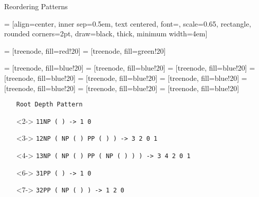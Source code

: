 \documentclass[18pt]{beamer}
\newcommand{\ul}[1]{{\color{red}{#1}}}
\begin{document}
\begin{frame}{Reordering Patterns}

 = [align=center, inner sep=0.5em, text centered, font=\sffamily, scale=0.65, rectangle, rounded corners=2pt, draw=black, thick, minimum width=4em]

 = [treenode, fill=red!20]
 = [treenode, fill=green!20]

 = [treenode, fill=blue!20]
 = [treenode, fill=blue!20]
 = [treenode, fill=blue!20]
 = [treenode, fill=blue!20]
 = [treenode, fill=blue!20]
 = [treenode, fill=blue!20]
 = [treenode, fill=blue!20]
 = [treenode, fill=blue!20]
 = [treenode, fill=blue!20]









\vspace{-0.2cm}
\begin{figure}
\centering

\end{figure}
\vspace{-0.6cm}
\begin{itemize}
\setlength{\itemsep}{0pt}
\setlength{\parskip}{0pt}
\setlength{\parsep}{0pt}
\scriptsize
\item[] \texttt{Root Depth Pattern}
\item[]<2-> \texttt{1\hphantom{xxxx}1\hphantom{xxxxx}NP ( \ul{NP$_0$} \ul{PP$_1$} ) -> 1 0}
\item[]<3-> \texttt{1\hphantom{xxxx}2\hphantom{xxxxx}NP ( NP ( \ul{JJ$_0$} \ul{NNS$_1$} ) PP ( \ul{IN$_2$} \ul{NP$_3$} ) ) -> 3 2 0 1}
\item[]<4-> \texttt{1\hphantom{xxxx}3\hphantom{xxxxx}NP ( NP ( \ul{JJ$_0$} \ul{NNS$_1$} ) PP ( \ul{IN$_2$} NP ( \ul{JJ$_3$} \ul{NNS$_4$} ) ) ) -> 3 4 2 0 1}
\item[]<6-> \texttt{3\hphantom{xxxx}1\hphantom{xxxxx}PP ( \ul{IN$_0$} \ul{NP$_1$} ) -> 1 0}
\item[]<7-> \texttt{3\hphantom{xxxx}2\hphantom{xxxxx}PP ( \ul{IN$_0$} NP ( \ul{JJ$_1$} \ul{NNS$_2$} ) ) -> 1 2 0}
\end{itemize}
\end{frame}
\end{document}
